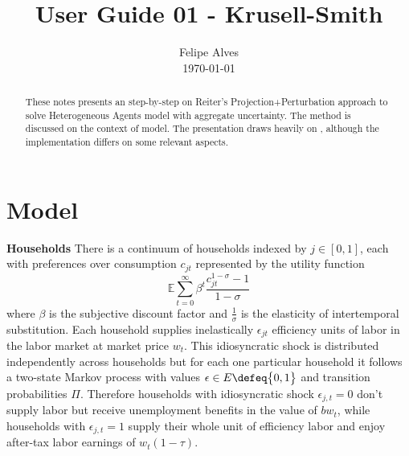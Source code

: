 \documentclass[a4paper,10pt]{article}  %
\title{User Guide 01 - Krusell-Smith \vspace{-1.00em}}
\author{
        \normalfont\large Felipe Alves \\[-2.5pt]       \normalsize
        \today
}
\date{ \vspace{-3em} }
\begin{document}
\maketitle

\begin{abstract}
   These notes presents an step-by-step on Reiter's Projection+Perturbation approach to solve Heterogeneous Agents model with aggregate
   uncertainty. The method is discussed on the context of \citet{krusell_smith} model. The presentation draws heavily on
   \citet{winberry}, although the implementation differs on some relevant aspects.
\end{abstract}



\section{Model} %
\label{sec:model}

\textbf{Households} \quad There is a continuum of households indexed by $ j\in [0,1] $, each with preferences over consumption
$ c_{jt} $ represented by the utility function
\begin{equation*}
   \label{eq:util}
   \mathbb{E}  \sum_{t=0}^{\infty} \beta^t \frac{ c_{jt}^{1- \sigma} -1}{ 1- \sigma }
\end{equation*}
where $ \beta $ is the subjective discount factor and $ \frac{1}{\sigma} $ is the elasticity of intertemporal substitution.
%
Each household supplies inelastically $ \epsilon_{jt} $ efficiency units of labor in the labor market at market price $w_t$.
This idiosyncratic shock is distributed independently across households but for each one particular
household it follows a two-state Markov process with values $\epsilon \in E\defeq  \big\{ 0,1 \big\} $ and transition probabilities $ \Pi $.
Therefore households with idiosyncratic shock $ \epsilon_{j,t} = 0 $ don't supply labor but receive
unemployment benefits in the value of $ bw_t $, while households with $\epsilon_{j,t}=1$ supply their whole unit of efficiency labor
and enjoy after-tax labor earnings of $ w_t ( 1-\tau ) $.
\end{document}
